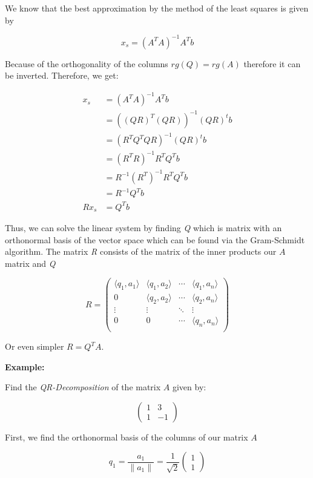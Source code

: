 We know that the best approximation by the method of the least squares is given by

\[
    x_s = (A^T A)^{-1} A^T b
\]

Because of the orthogonality of the columns \(rg(Q) = rg(A)\) therefore it can be inverted. Therefore,
we get:

\begin{align*}
    x_s &= (A^T A)^{-1} A^T b \\
        &= ((QR)^T (QR))^{-1} (QR)^t b \\
        &= (R^T Q^T QR)^{-1} (QR)^t b \\
        &= (R^T R)^{-1} R^T Q^T b \\
        &=  R^{-1} (R^T)^{-1} R^T Q^T b \\
        &=  R^{-1} Q^T b \\
    Rx_s&= Q^T b
\end{align*}

Thus, we can solve the linear system by finding \emph{Q} which is matrix with an orthonormal basis of the 
vector space which can be found via the Gram-Schmidt algorithm. The matrix \emph{R} consists of the matrix of the 
inner products our \(A\) matrix and \emph{Q}

\[
    R =
    \begin{pmatrix}
        \langle q_1, a_1 \rangle & \langle q_1, a_2 \rangle & \cdots &\langle q_1, a_n\rangle \\ 
        0 & \langle q_2, a_2 \rangle & \cdots & \langle q_2, a_n\rangle \\ 
        \vdots & \vdots  & \ddots & \vdots \\
        0 & 0  & \cdots & \langle q_n, a_n \rangle \\ 
    \end{pmatrix}
\]

Or even simpler \(R = Q^T A\).

\textbf{Example:}

Find the \emph{QR-Decomposition} of the matrix \(A\) given by:

\[
    \begin{pmatrix}
        1 & 3 \\
        1 & -1 
    \end{pmatrix}
\]

First, we find the orthonormal basis of the columns of our matrix \(A\) 

\[ 
    q_1 = \frac{a_1}{\|a_1\|} = \frac{1}{\sqrt{2}} \begin{pmatrix} 1 \\ 1 \end{pmatrix}
\]

